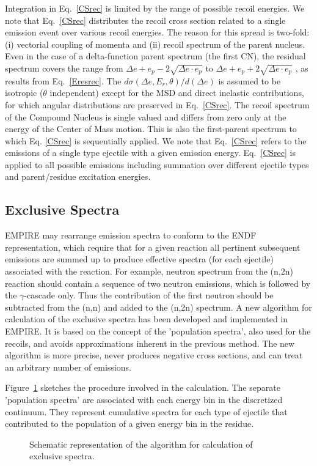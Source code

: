 Integration in Eq.~\ref{CSrec} is limited by the range of possible recoil
energies. We note that Eq.~\ref{CSrec} distributes the recoil cross section
related to a single emission event over various recoil energies. The reason
for this spread is two-fold: (i) vectorial coupling of momenta and (ii)
recoil spectrum of the parent nucleus. Even in the case of a delta-function
parent spectrum (the first CN), the residual spectrum covers the range from $%
\Delta e+e_{p}-2\sqrt{\Delta e\cdot e_{p}}$ to $\Delta e+e_{p}+2\sqrt{\Delta
e\cdot e_{p}}$ , as results from Eq.~\ref{Eresrec}. The $d\sigma(\Delta
e,E_{r},\theta)/d(\Delta e)$ is assumed to be isotropic ($\theta$
independent) except for the MSD%
 and direct inelastic contributions, for which angular
distributions are preserved in Eq.~\ref{CSrec}. The recoil spectrum of the
Compound Nucleus is single valued and differs from zero only at the energy
of the Center of Mass motion. This is also the first-parent spectrum to
which Eq. \ref{CSrec} is sequentially applied. We note that Eq.~\ref{CSrec}
refers to the emissions of a single type ejectile with a given emission
energy. Eq.~\ref{CSrec} is applied to all possible emissions including
summation over different ejectile types and parent/residue excitation
energies.

\subsection{Exclusive Spectra}

EMPIRE may rearrange emission spectra to conform to the ENDF representation,
which require that for a given reaction all pertinent subsequent emissions
are summed up to produce effective spectra (for each ejectile) associated
with the reaction. For example, neutron spectrum from the (n,2n) reaction
should contain a sequence of two neutron emissions, which is followed by the 
$\gamma$-cascade only. Thus the contribution of the first neutron should be
subtracted from the (n,n) and added to the (n,2n) spectrum. A new algorithm
for calculation of the exclusive spectra has been developed and implemented
in EMPIRE. It is based on the concept of the 'population spectra', also used
for the recoils, and avoids approximations inherent in the previous method.
The new algorithm is more precise, never produces negative cross sections,
and can treat an arbitrary number of emissions.

Figure~\ref{exclusive} sketches the procedure involved in the calculation.
The separate 'population spectra' are associated with each energy bin in the
discretized continuum. They represent cumulative spectra for each type of
ejectile that contributed to the population of a given energy bin in the
residue. 
\begin{figure}[htbp]
\caption{Schematic representation of the algorithm for calculation of
exclusive spectra.}
\label{exclusive}
\end{figure}

